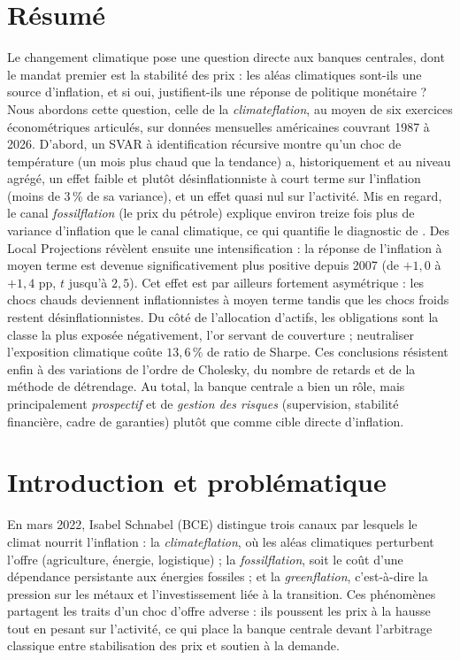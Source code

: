 \documentclass[11pt,a4paper]{article}
\begin{document}
\section*{Résumé}
\small
Le changement climatique pose une question directe aux banques centrales, dont le mandat
premier est la stabilité des prix : les aléas climatiques sont-ils une source d'inflation,
et si oui, justifient-ils une réponse de politique monétaire ? Nous abordons cette
question, celle de la \emph{climateflation}, au moyen de six exercices économétriques
articulés, sur données mensuelles américaines couvrant 1987 à 2026. D'abord, un SVAR à
identification récursive montre qu'un choc de température (un mois plus chaud que la tendance)
a, historiquement et au niveau agrégé, un effet faible et plutôt désinflationniste à
court terme sur l'inflation (moins de 3\,\% de sa variance), et un effet quasi nul sur l'activité.
Mis en regard, le canal \emph{fossilflation} (le prix du pétrole) explique
environ treize fois plus de variance d'inflation que le canal climatique, ce qui quantifie
le diagnostic de \citet{schnabel2022}. Des Local Projections révèlent ensuite une
intensification : la réponse de l'inflation à moyen terme est devenue
significativement plus positive depuis 2007 (de $+1{,}0$ à $+1{,}4$ pp, $t$ jusqu'à $2{,}5$).
Cet effet est par ailleurs fortement asymétrique : les chocs chauds
deviennent inflationnistes à moyen terme tandis que les chocs froids restent désinflationnistes.
Du côté de l'allocation d'actifs, les obligations sont la classe la plus exposée
négativement, l'or servant de couverture ; neutraliser l'exposition climatique
coûte $13{,}6\,\%$ de ratio de Sharpe. Ces conclusions résistent enfin à des variations de
l'ordre de Cholesky, du nombre de retards et de la méthode de détrendage. Au total, la
banque centrale a bien un rôle, mais principalement \emph{prospectif} et de \emph{gestion
des risques} (supervision, stabilité financière, cadre de garanties) plutôt que comme cible
directe d'inflation.
\normalsize

\tableofcontents
\vspace{0.3cm}

\section{Introduction et problématique}
En mars 2022, Isabel Schnabel (BCE) distingue trois canaux par lesquels le climat nourrit
l'inflation \citep{schnabel2022} : la \emph{climateflation}, où les aléas climatiques
perturbent l'offre (agriculture, énergie, logistique) ; la \emph{fossilflation}, soit le coût
d'une dépendance persistante aux énergies fossiles ; et la \emph{greenflation}, c'est-à-dire la pression
sur les métaux et l'investissement liée à la transition. Ces phénomènes partagent les
traits d'un choc d'offre adverse : ils poussent les prix à la hausse tout en pesant sur
l'activité, ce qui place la banque centrale devant l'arbitrage classique entre stabilisation des
prix et soutien à la demande.
\end{document}

